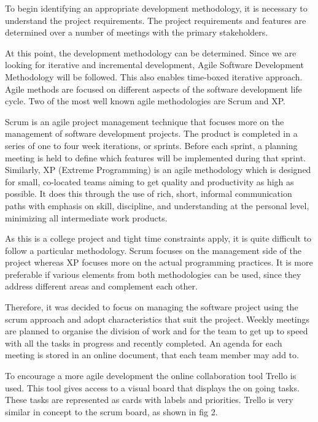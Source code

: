 To begin identifying an appropriate development methodology, it is necessary to understand the project requirements. The project requirements and features are determined over a number of meetings with the primary stakeholders. 

At this point, the development methodology can be determined. Since we are looking for iterative and incremental development, Agile Software Development Methodology will be followed. This also enables time-boxed iterative approach. Agile methods are focused on different aspects of the software development life cycle. Two of the most well known agile methodologies are Scrum and XP.

Scrum is an agile project management technique that focuses more on the management of software development projects. The product is completed in a series of one to four week iterations, or sprints. Before each sprint, a planning meeting is held to define which features will be implemented during that sprint. Similarly, XP (Extreme Programming) is an agile methodology which is designed for small, co-located teams aiming to get quality and productivity as high as possible. It does this through the use of rich, short, informal communication paths with emphasis on skill, discipline, and understanding at the personal level, minimizing all intermediate work products.

As this is a college project and tight time constraints apply, it is quite
difficult to follow a particular methodology. Scrum focuses on the management
side of the project whereas XP focuses more on the actual programming
practices. It is more preferable if various elements from both methodologies
can be used, since they address different areas and complement each other.

Therefore, it was decided to focus on managing the software project using the scrum
approach and adopt characteristics that suit the project. Weekly meetings are planned to organise the division
of work and for the team to get up to speed with all the tasks in progress and recently
completed. An agenda for each meeting is stored in an online document, that
each team member may add to. 

To encourage a more agile development the online collaboration tool
Trello is used. This tool gives access to a visual board that displays the
on going tasks. These tasks are represented as cards with labels and priorities. 
Trello is very similar in concept to the scrum board, as shown in fig 2.


